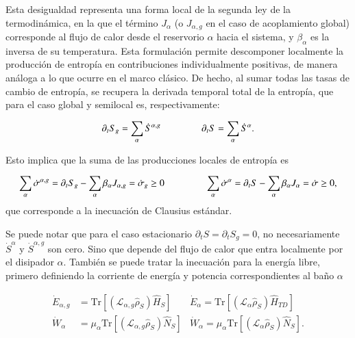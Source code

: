 Esta desigualdad representa una forma local de la segunda ley de la termodinámica, en la que el término $J_\alpha$ (o $J_{\alpha,g}$ en el caso de acoplamiento global) corresponde al flujo de calor desde el reservorio $\alpha$ hacia el sistema, y $\beta_\alpha$ es la inversa de su temperatura. Esta formulación permite descomponer localmente la producción de entropía en contribuciones individualmente positivas, de manera análoga a lo que ocurre en el marco clásico. De hecho, al sumar todas las tasas de cambio de entropía, se recupera la derivada temporal total de la entropía, que para el caso global y semilocal es, respectivamente: 

\begin{equation*}
    \partial_t S_{g} = \sum_\alpha \dot{S}^{\alpha,g} \hspace{15mm}
    \partial_t S = \sum_\alpha \dot{S}^\alpha.
\end{equation*}    

Esto implica que la suma de las producciones locales de entropía es

\begin{equation*}
    \sum_{\alpha}\dot{\sigma}^{\alpha,g} = \partial_{t}S_{g} - \sum_{\alpha}\beta_{\alpha}J_{\alpha,g} = \dot{\sigma}_{g} \geq 0 \hspace{15mm}
    \sum_{\alpha}\dot{\sigma}^{\alpha} =\partial_{t}S  -\sum_{\alpha}\beta_{\alpha}J_{\alpha} = \dot{\sigma} \geq 0, 
\end{equation*}
que corresponde a la inecuación de Clausius estándar.

Se puede notar que para el caso estacionario $\partial_{t}S = \partial_{t}S_{g} = 0$, no necesariamente $\dot{S}^{\alpha}$ y $\dot{S}^{\alpha,g}$ son cero. Sino que depende del flujo de calor que entra localmente por el disipador $\alpha$. También se puede tratar la inecuación para la energía libre, primero definiendo la corriente de energía y potencia correspondientes al baño $\alpha$

\begin{align*}
    \dot{E}_{\alpha,g} & = \text{Tr}[ (\mathcal{L}_{\alpha,g} \hat{\rho}_{S}) \hat{H}_{S}]   & \dot{E}_{\alpha} = \text{Tr}[ (\mathcal{L}_{\alpha} \hat{\rho}_{S}) \hat{H}_{TD}]   \\
    \dot{W}_{\alpha} & = \mu_{\alpha}\text{Tr}[ (\mathcal{L}_{\alpha,g} \hat{\rho}_{S}) \hat{N}_{S}] &  \dot{W}_{\alpha} = \mu_{\alpha}\text{Tr}[ (\mathcal{L}_{\alpha} \hat{\rho}_{S}) \hat{N}_{S}].
\end{align*}

